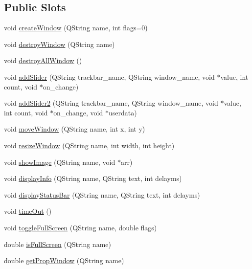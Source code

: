 \subsection*{Public Slots}
\begin{DoxyCompactItemize}
\item 
void \hyperlink{classGuiReceiver_a59873b996659d0bb92d09638902ec4dc}{create\-Window} (Q\-String name, int flags=0)
\item 
void \hyperlink{classGuiReceiver_a86942e372e278c27c98af1930d9b9e97}{destroy\-Window} (Q\-String name)
\item 
void \hyperlink{classGuiReceiver_a748313239bdf5a50cc877dd91b3c1950}{destroy\-All\-Window} ()
\item 
void \hyperlink{classGuiReceiver_a8bd54a4f6d6f56083c2146173be6a1e3}{add\-Slider} (Q\-String trackbar\-\_\-name, Q\-String window\-\_\-name, void $\ast$value, int count, void $\ast$on\-\_\-change)
\item 
void \hyperlink{classGuiReceiver_a02ddc77f4583508363df717fd0859786}{add\-Slider2} (Q\-String trackbar\-\_\-name, Q\-String window\-\_\-name, void $\ast$value, int count, void $\ast$on\-\_\-change, void $\ast$userdata)
\item 
void \hyperlink{classGuiReceiver_abb7e0a41c2db119bfd76906651feb5aa}{move\-Window} (Q\-String name, int x, int y)
\item 
void \hyperlink{classGuiReceiver_a42b8802376fe8f63922969475875eea6}{resize\-Window} (Q\-String name, int width, int height)
\item 
void \hyperlink{classGuiReceiver_a185d6468377d45e2a2589bbb64a9ec62}{show\-Image} (Q\-String name, void $\ast$arr)
\item 
void \hyperlink{classGuiReceiver_a1e010c3db9ebaaf1efddb8c03f558e88}{display\-Info} (Q\-String name, Q\-String text, int delayms)
\item 
void \hyperlink{classGuiReceiver_abfc7c7fb831a8c423a7a15e2b0ec994b}{display\-Status\-Bar} (Q\-String name, Q\-String text, int delayms)
\item 
void \hyperlink{classGuiReceiver_aa8aab548c6a8fb1463c6cc7eb133ce7c}{time\-Out} ()
\item 
void \hyperlink{classGuiReceiver_a50571c44603479d7d96426b1de23b010}{toggle\-Full\-Screen} (Q\-String name, double flags)
\item 
double \hyperlink{classGuiReceiver_a6dd924ef78d8e7ec9e008f9007dbd032}{is\-Full\-Screen} (Q\-String name)
\item 
double \hyperlink{classGuiReceiver_aff1aa23d540c06006c295ce69c8bb771}{get\-Prop\-Window} (Q\-String name)

\end{DoxyCompactItemize}
